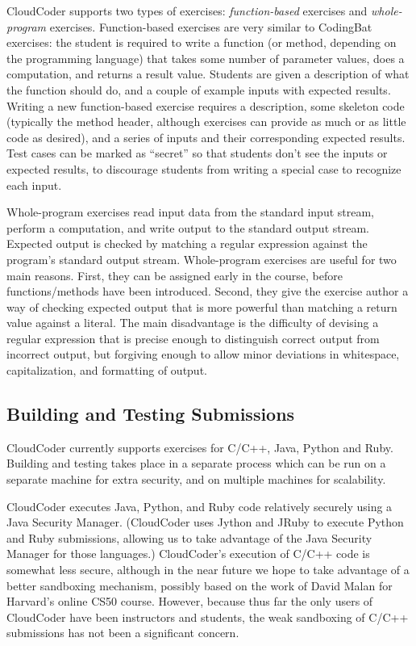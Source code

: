 \documentclass{sig-alternate}
\begin{document}
CloudCoder supports two types of exercises:  {\em function-based}
exercises and {\em whole-program} exercises.  Function-based exercises are
very similar to CodingBat exercises: the student is required to write
a function (or method, depending on the programming language) that takes some number of parameter values,
does a computation, and returns a result value.
Students are given a description of
what the function should do, and a couple of example inputs with
expected results.  Writing a new function-based exercise
requires a description, some skeleton code (typically the method
header, although exercises can provide as much or as little code as
desired), and a series of inputs and their corresponding expected results.
Test cases can be marked as ``secret'' so that students don't see the
inputs or expected results, to discourage students from writing a special case to
recognize each input.

Whole-program exercises read input data from
the standard input stream, perform a computation, and write output to the standard output stream.
Expected output is checked by matching a regular expression against the
program's standard output stream.
Whole-program exercises are useful for two main reasons.  First,
they can be assigned early in the course, before functions/methods
have been introduced.  Second, they give the exercise author a
way of checking expected output that is more powerful than matching a return
value against a literal.  The main disadvantage is
the difficulty of devising a
regular expression that is precise enough to distinguish correct output
from incorrect output, but forgiving enough to allow minor deviations
in whitespace, capitalization, and formatting of output.

\subsection{Building and Testing Submissions}

CloudCoder currently supports exercises for C/C++, Java, Python and
Ruby.  Building and testing takes place in a separate process which
can be run on a separate machine for extra security, and on multiple
machines for scalability.

CloudCoder executes Java, Python, and Ruby code relatively securely using
a Java Security Manager.
(CloudCoder uses Jython\cite{jython} and JRuby\cite{jruby}
to execute Python and Ruby submissions, allowing us to take advantage of
the Java Security Manager for those languages.)
CloudCoder's execution of C/C++ code is somewhat less secure, although 
in the near future
we hope to take advantage of a better sandboxing mechanism,
possibly based on the work of
David Malan for Harvard's online CS50 course\cite{Malan:2013:CSS:2445196.2445242}.
However, because thus far the only users of
CloudCoder have been instructors and students,
the weak sandboxing of C/C++ submissions has not been a significant concern.
\end{document}
